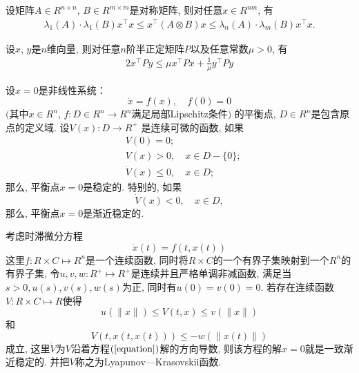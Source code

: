     \begin{lem}\label{lem:2}{\rm{}}
        设矩阵$A\in R^{n\times n}$, $B\in R^{m\times m}$是对称矩阵, 则对任意$x\in R^{nm}$, 有
        \begin{align*}
            \lambda_{1}(A)\cdot\lambda_{1}(B)x^{\top}x\leq x^{\top}(A\otimes B)x\leq \lambda_{n}(A)\cdot\lambda_{m}(B)x^{\top}x.
        \end{align*}
    \end{lem}
    \begin{lem}{\rm{}}\label{lem_leq}
           设$x$, $y$是$n$维向量, 则对任意$n$阶半正定矩阵$P$以及任意常数$\mu>0$, 有
            \begin{align*}
            2x^{\top}Py\leq\mu x^{\top}Px+\frac{1}{\mu}y^{\top}Py
            \end{align*}
    \end{lem}

    \begin{lem}[Lyapunov稳定性定理]\label{lem:lyapunov}
        设$x=0$是非线性系统：
        \begin{equation*}
          \dot{x}=f(x), \quad f(0)=0
        \end{equation*}
        $($其中$x \in R^n$, $f:D \in R^n \rightarrow R^n$满足局部{\rm{Lipschitz}}条件$)$
        的平衡点, $D \in R^n$是包含原点的定义域. 设$V(x):D \rightarrow R^{+}$
        是连续可微的函数, 如果
        \begin{align*}
          &V(0)=0;\\
          &V(x)>0,\quad x \in D-\{0\};\\
          &\dot{V}(x) \leq 0,\quad x \in D;
        \end{align*}
        那么, 平衡点$x=0$是稳定的. 特别的, 如果
            $$\dot{V}(x) < 0, \quad x \in D, $$
         那么, 平衡点$x=0$是渐近稳定的.
    \end{lem}
\begin{lem}\label{lem:lyapunov}
考虑时滞微分方程
\begin{equation}\label{equation}
    \dot{x}(t)=f(t,x(t))
\end{equation}
这里$f:R\times C\mapsto R^{n}$是一个连续函数, 同时将$R\times C$的一个有界子集映射到一个$R^{n}$的有界子集, 令$u, v, w:R^{+}\mapsto R^{+}$是连续并且严格单调非减函数, 满足当$s>0, u(s), v(s), w(s)$为正, 同时有$u(0)=v(0)=0$. 若存在连续函数$V:R\times C\mapsto R$使得
$$u(\parallel x\parallel)\leq V(t,x)\leq v(\parallel x\parallel)$$
和
$$V(t, x(t, x(t)))\leq-w(\parallel x(t)\parallel)$$
成立, 这里$\dot{V}$为$V$沿着方程$(\ref{equation})$解的方向导数, 则该方程的解$x=0$就是一致渐近稳定的. 并把$V$称之为{\rm{Lyapunov—Krasovskii}}函数.
\end{lem}

